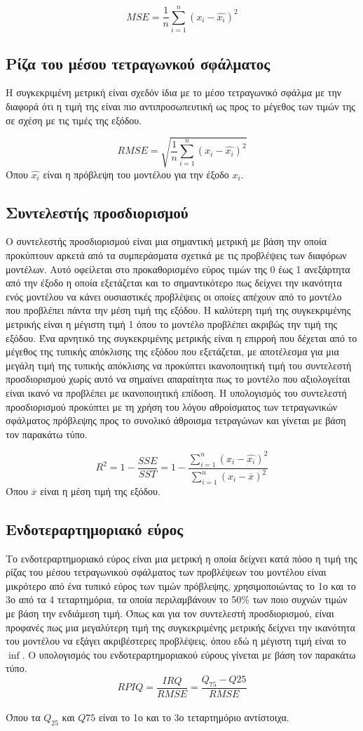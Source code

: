 $$MSE=\frac{1}{n}\sum_{i=1}^{n} {\left(x_{i}-\hat{x_{i}}\right)}^2$$

\subsection{Ρίζα του μέσου τετραγωνκού σφάλματος}
Η συγκεκριμένη μετρική είναι σχεδόν ίδια με το μέσο τετραγωνικό σφάλμα με την διαφορά ότι η τιμή της είναι πιο αντιπροσωπευτική ως προς το μέγεθος των τιμών της σε σχέση με τις τιμές της εξόδου.

$$RMSE=\sqrt{\frac{1}{n}\sum_{i=1}^{n} {\left(x_{i}-\hat{x_{i}}\right)}^2}$$
Όπου $\hat{x_{i}}$ είναι η πρόβλεψη του μοντέλου για την έξοδο $x_i$.

\subsection{Συντελεστής προσδιορισμού}
Ο συντελεστής προσδιορισμού  είναι μια σημαντική μετρική με βάση την οποία προκύπτουν αρκετά από τα συμπεράσματα σχετικά με τις προβλέψεις των διαφόρων μοντέλων. Αυτό οφείλεται στο προκαθορισμένο εύρος τιμών της 0 έως 1 ανεξάρτητα από την έξοδο η οποία εξετάζεται και το σημαντικότερο πως δείχνει την ικανότητα ενός μοντέλου να κάνει ουσιαστικές προβλέψεις οι οποίες απέχουν από το μοντέλο που προβλέπει πάντα την μέση τιμή της εξόδου. Η καλύτερη τιμή της συγκεκριμένης μετρικής είναι η μέγιστη τιμή 1 όπου το μοντέλο προβλέπει ακριβώς την τιμή της εξόδου. Ένα αρνητικό της συγκεκριμένης μετρικής είναι η επιρροή που δέχεται από το μέγεθος της τυπικής απόκλισης της εξόδου που εξετάζεται, με αποτέλεσμα για μια μεγάλη τιμή της τυπικής απόκλισης να προκύπτει ικανοποιητική τιμή του συντελεστή προσδιορισμού χωρίς αυτό να σημαίνει απαραίτητα πως το μοντέλο που αξιολογείται είναι ικανό να προβλέπει με ικανοποιητική επίδοση. Η υπολογισμός του συντελεστή προσδιορισμού προκύπτει με τη χρήση του λόγου αθροίσματος των τετραγωνικών σφάλματος πρόβλεψης  προς το συνολικό άθροισμα τετραγώνων  και γίνεται με βάση τον παρακάτω τύπο.

$$R^2=1-\frac{SSE}{SST}=1-\frac{\sum_{i=1}^{n} {\left(x_{i}-\hat{x_{i}}\right)}^2}{\sum_{i=1}^{n} {\left(x_{i}-\overline{x}\right)}^2}$$
Όπου $\overline{x}$ είναι η μέση τιμή της εξόδου.

\subsection{Ενδοτεραρτημοριακό εύρος}
Το ενδοτεραρτημοριακό εύρος είναι μια μετρική η οποία δείχνει κατά πόσο η τιμή της ρίζας του μέσου τετραγωνικού σφάλματος των προβλέψεων του μοντέλου είναι μικρότερο από ένα τυπικό εύρος των τιμών πρόβλεψης, χρησιμοποιώντας το 1ο και το 3ο από τα 4 τεταρτημόρια, τα οποία περιλαμβάνουν το 50\% των ποιο συχνών τιμών με βάση την ενδιάμεση τιμή. Όπως και για τον συντελεστή προσδιορισμού, είναι προφανές πως μια μεγαλύτερη τιμή της συγκεκριμένης μετρικής δείχνει την ικανότητα του μοντέλου να εξάγει ακριβέστερες προβλέψεις, όπου εδώ η μέγιστη τιμή είναι το $\inf$. Ο υπολογισμός του ενδοτεραρτημοριακού εύρους γίνεται με βάση τον παρακάτω τύπο.\\

$$RPIQ=\frac{IRQ}{RMSE}=\frac{Q_{75}-Q{25}}{RMSE}$$ \\
Όπου τα $Q_{25}$ και $Q{75}$ είναι το 1ο και το 3ο τεταρτημόριο αντίστοιχα.
